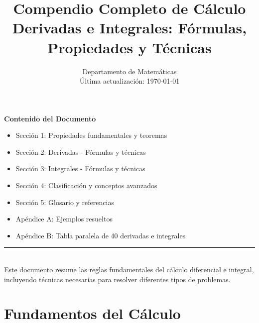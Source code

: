 \documentclass{article}
\title{\Huge\textbf{Compendio Completo de Cálculo}\\
\Large Derivadas e Integrales: Fórmulas, Propiedades y Técnicas}
\author{\Large Departamento de Matemáticas\\[0.5em]
\small Última actualización: \today}
\date{}
\begin{document}
\begin{titlepage}
    \maketitle
    \centering
    \vspace{2cm}
    
    \begin{tcolorbox}[
        enhanced,
        sharp corners,
        colback=white,
        colframe=black,
        width=0.8\textwidth,
        center,
        fontupper=\large,
        drop shadow={black!50!white}
    ]
        \centering
        \textbf{Contenido del Documento}\\[0.5em]
        \begin{minipage}{0.9\textwidth}
            \begin{itemize}
                \item Sección 1: Propiedades fundamentales y teoremas
                \item Sección 2: Derivadas - Fórmulas y técnicas
                \item Sección 3: Integrales - Fórmulas y técnicas
                \item Sección 4: Clasificación y conceptos avanzados
                \item Sección 5: Glosario y referencias
                \item Apéndice A: Ejemplos resueltos
                \item Apéndice B: Tabla paralela de 40 derivadas e integrales
            \end{itemize}
        \end{minipage}
    \end{tcolorbox}
    
    \vfill
    \rule{0.8\textwidth}{0.4pt}\\[0.5em]
    \small Este documento resume las reglas fundamentales del cálculo diferencial e integral,\\
    incluyendo técnicas necesarias para resolver diferentes tipos de problemas.
\end{titlepage}

\tableofcontents
\newpage

\section{Fundamentos del Cálculo}
\end{document}
